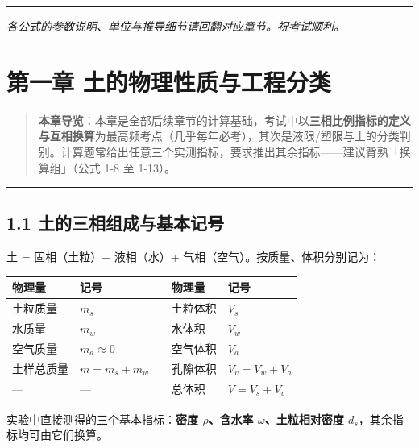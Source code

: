 \documentclass[
]{article}
\newcounter{none} %
\begin{document}
\begin{center}\rule{0.5\linewidth}{0.5pt}\end{center}

\emph{各公式的参数说明、单位与推导细节请回翻对应章节。祝考试顺利。}

\newpage

\section{第一章
土的物理性质与工程分类}\label{ux7b2cux4e00ux7ae0-ux571fux7684ux7269ux7406ux6027ux8d28ux4e0eux5de5ux7a0bux5206ux7c7b}

\begin{quote}
\textbf{本章导览}：本章是全部后续章节的计算基础，考试中以\textbf{三相比例指标的定义与互相换算}为最高频考点（几乎每年必考），其次是液限/塑限与土的分类判别。计算题常给出任意三个实测指标，要求推出其余指标------建议背熟「换算组」（公式
1-8 至 1-13）。
\end{quote}

\begin{center}\rule{0.5\linewidth}{0.5pt}\end{center}

\subsection{1.1
土的三相组成与基本记号}\label{ux571fux7684ux4e09ux76f8ux7ec4ux6210ux4e0eux57faux672cux8bb0ux53f7}

土 = 固相（土粒）+ 液相（水）+ 气相（空气）。按质量、体积分别记为：

{\def\LTcaptype{none} %
\begin{longtable}[]{@{}lllll@{}}
\toprule\noalign{}
物理量 & 记号 & & 物理量 & 记号 \\
\midrule\noalign{}
\endhead
\bottomrule\noalign{}
\endlastfoot
土粒质量 & \(m_s\) & & 土粒体积 & \(V_s\) \\
水质量 & \(m_w\) & & 水体积 & \(V_w\) \\
空气质量 & \(m_a\approx0\) & & 空气体积 & \(V_a\) \\
土样总质量 & \(m=m_s+m_w\) & & 孔隙体积 & \(V_v=V_w+V_a\) \\
--- & --- & & 总体积 & \(V=V_s+V_v\) \\
\end{longtable}
}

实验中直接测得的三个基本指标：\textbf{密度 \(\rho\)、含水率
\(\omega\)、土粒相对密度 \(d_s\)}，其余指标均可由它们换算。
\end{document}
